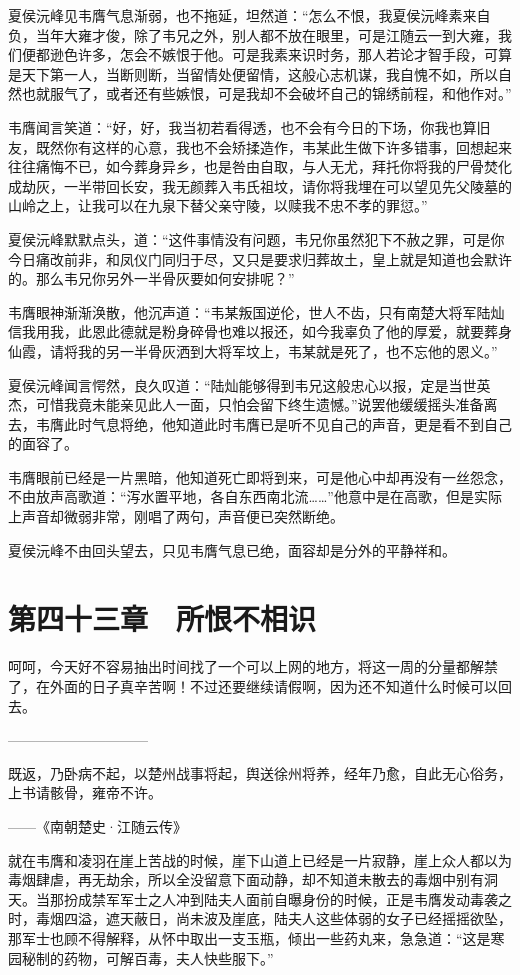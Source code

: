 夏侯沅峰见韦膺气息渐弱，也不拖延，坦然道：“怎么不恨，我夏侯沅峰素来自负，当年大雍才俊，除了韦兄之外，别人都不放在眼里，可是江随云一到大雍，我们便都逊色许多，怎会不嫉恨于他。可是我素来识时务，那人若论才智手段，可算是天下第一人，当断则断，当留情处便留情，这般心志机谋，我自愧不如，所以自然也就服气了，或者还有些嫉恨，可是我却不会破坏自己的锦绣前程，和他作对。”

韦膺闻言笑道：“好，好，我当初若看得透，也不会有今日的下场，你我也算旧友，既然你有这样的心意，我也不会矫揉造作，韦某此生做下许多错事，回想起来往往痛悔不已，如今葬身异乡，也是咎由自取，与人无尤，拜托你将我的尸骨焚化成劫灰，一半带回长安，我无颜葬入韦氏祖坟，请你将我埋在可以望见先父陵墓的山岭之上，让我可以在九泉下替父亲守陵，以赎我不忠不孝的罪愆。”

夏侯沅峰默默点头，道：“这件事情没有问题，韦兄你虽然犯下不赦之罪，可是你今日痛改前非，和凤仪门同归于尽，又只是要求归葬故土，皇上就是知道也会默许的。那么韦兄你另外一半骨灰要如何安排呢？”

韦膺眼神渐渐涣散，他沉声道：“韦某叛国逆伦，世人不齿，只有南楚大将军陆灿信我用我，此恩此德就是粉身碎骨也难以报还，如今我辜负了他的厚爱，就要葬身仙霞，请将我的另一半骨灰洒到大将军坟上，韦某就是死了，也不忘他的恩义。”

夏侯沅峰闻言愕然，良久叹道：“陆灿能够得到韦兄这般忠心以报，定是当世英杰，可惜我竟未能亲见此人一面，只怕会留下终生遗憾。”说罢他缓缓摇头准备离去，韦膺此时气息将绝，他知道此时韦膺已是听不见自己的声音，更是看不到自己的面容了。

韦膺眼前已经是一片黑暗，他知道死亡即将到来，可是他心中却再没有一丝怨念，不由放声高歌道：“泻水置平地，各自东西南北流……”他意中是在高歌，但是实际上声音却微弱非常，刚唱了两句，声音便已突然断绝。

夏侯沅峰不由回头望去，只见韦膺气息已绝，面容却是分外的平静祥和。

\chapter{第四十三章　所恨不相识}

呵呵，今天好不容易抽出时间找了一个可以上网的地方，将这一周的分量都解禁了，在外面的日子真辛苦啊！不过还要继续请假啊，因为还不知道什么时候可以回去。

——————————

既返，乃卧病不起，以楚州战事将起，舆送徐州将养，经年乃愈，自此无心俗务，上书请骸骨，雍帝不许。

——《南朝楚史·江随云传》

就在韦膺和凌羽在崖上苦战的时候，崖下山道上已经是一片寂静，崖上众人都以为毒烟肆虐，再无劫余，所以全没留意下面动静，却不知道未散去的毒烟中别有洞天。当那扮成禁军军士之人冲到陆夫人面前自曝身份的时候，正是韦膺发动毒袭之时，毒烟四溢，遮天蔽日，尚未波及崖底，陆夫人这些体弱的女子已经摇摇欲坠，那军士也顾不得解释，从怀中取出一支玉瓶，倾出一些药丸来，急急道：“这是寒园秘制的药物，可解百毒，夫人快些服下。”

